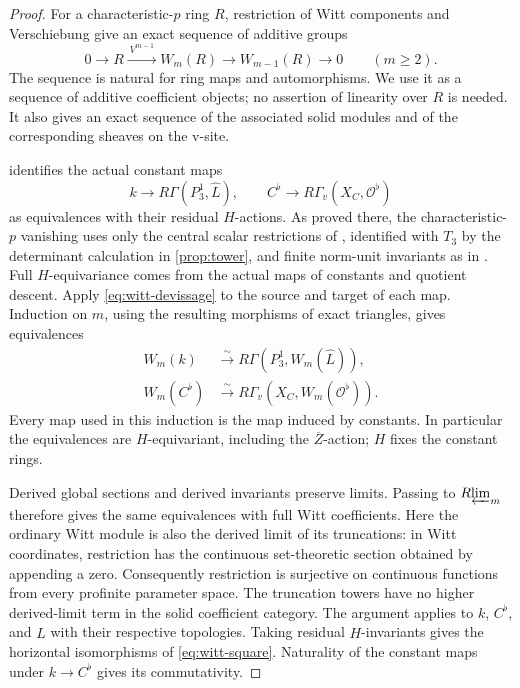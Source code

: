 \documentclass[11pt]{article}
\numberwithin{equation}{section}
\theoremstyle{definition}
\theoremstyle{remark}
\begin{document}
\begin{proof}
For a characteristic-$p$ ring $R$, restriction of Witt components and
Verschiebung give an exact sequence of additive groups
\begin{equation}\label{eq:witt-devissage}
 0\longrightarrow R\xrightarrow{\ V^{m-1}\ }W_m(R)
   \longrightarrow W_{m-1}(R)\longrightarrow0
 \qquad(m\geq2).
\end{equation}
The sequence is natural for ring maps and automorphisms.  We use it as
a sequence of additive coefficient objects; no assertion of linearity
over $R$ is needed.  It also gives an exact sequence of the associated
solid modules and of the corresponding sheaves on the v-site.

 identifies the actual constant maps
\[
 k\longrightarrow R\Gamma(P_3^1,\widehat L),\qquad
 C^\flat\longrightarrow R\Gamma_v(X_C,\mathcal O^\flat)
\]
as equivalences with their residual $H$-actions.  As proved there,
the characteristic-$p$ vanishing uses only the central scalar
restrictions of \cite[Propositions~3.5.6 and~3.6.9]{BMR2026}, identified
with $T_3$ by the determinant calculation in \cref{prop:tower}, and finite
norm-unit
invariants as in \cite[Lemma~5.2.5]{BMR2026}.  Full $H$-equivariance
comes from the actual maps of constants and quotient descent.
Apply \eqref{eq:witt-devissage} to the source and target of each map.
Induction on $m$, using the resulting morphisms of exact triangles,
gives equivalences
\begin{align*}
 W_m(k)&\xrightarrow{\sim}
       R\Gamma(P_3^1,W_m(\widehat L)),\\
 W_m(C^\flat)&\xrightarrow{\sim}
       R\Gamma_v(X_C,W_m(\mathcal O^\flat)).
\end{align*}
Every map used in this induction is the map induced by constants.
In particular the equivalences are $H$-equivariant, including the
$\overline Z$-action; $H$ fixes the constant rings.

Derived global sections and derived invariants preserve limits.
Passing to $R\!\varprojlim_m$ therefore gives the same equivalences with full
Witt coefficients.  Here the ordinary Witt module is also the derived
limit of its truncations: in Witt coordinates, restriction has the
continuous set-theoretic section obtained by appending a zero.
Consequently restriction is surjective on continuous functions from
every profinite parameter space.  The truncation towers have no higher
derived-limit term in the solid coefficient category.  The argument
applies to $k$, $C^\flat$, and $\widehat L$ with their respective
topologies.  Taking residual $H$-invariants gives the horizontal
isomorphisms of \eqref{eq:witt-square}.  Naturality of the constant
maps under $k\to C^\flat$ gives its commutativity.


\end{proof}
\end{document}
